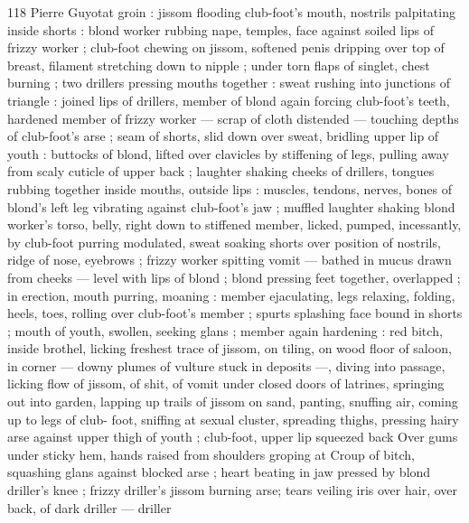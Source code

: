 118 Pierre Guyotat
groin : jissom flooding club-foot's mouth, nostrils palpitating inside
shorts : blond worker rubbing nape, temples, face against soiled lips
of frizzy worker ; club-foot chewing on jissom, softened penis
dripping over top of breast, filament stretching down to nipple ;
under torn flaps of singlet, chest burning ; two drillers pressing
mouths together : sweat rushing into junctions of triangle : joined
lips of drillers, member of blond again forcing club-foot's teeth,
hardened member of frizzy worker — scrap of cloth distended —
touching depths of club-foot's arse ; seam of shorts, slid down over
sweat, bridling upper lip of youth : buttocks of blond, lifted over
clavicles by stiffening of legs, pulling away from scaly cuticle of
upper back ; laughter shaking cheeks of drillers, tongues rubbing
together inside mouths, outside lips : muscles, tendons, nerves,
bones of blond’s left leg vibrating against club-foot’s jaw ; muffled
laughter shaking blond worker's torso, belly, right down to stiffened
member, licked, pumped, incessantly, by club-foot purring
modulated, sweat soaking shorts over position of nostrils, ridge of
nose, eyebrows ; frizzy worker spitting vomit — bathed in mucus
drawn from cheeks — level with lips of blond ; blond pressing feet
together, overlapped ; in erection, mouth purring, moaning : member
ejaculating, legs relaxing, folding, heels, toes, rolling over club-foot's
member ; spurts splashing face bound in shorts ; mouth of youth,
swollen, seeking glans ; member again hardening : red bitch, inside
brothel, licking freshest trace of jissom, on tiling, on wood floor of
saloon, in corner — downy plumes of vulture stuck in deposits —,
diving into passage, licking flow of jissom, of shit, of vomit under
closed doors of latrines, springing out into garden, lapping up trails
of jissom on sand, panting, snuffing air, coming up to legs of club-
foot, sniffing at sexual cluster, spreading thighs, pressing hairy arse
against upper thigh of youth ; club-foot, upper lip squeezed back
Over gums under sticky hem, hands raised from shoulders groping at
Croup of bitch, squashing glans against blocked arse ; heart beating
in jaw pressed by blond driller's knee ; frizzy driller's jissom burning
arse; tears veiling iris over hair, over back, of dark driller — driller

